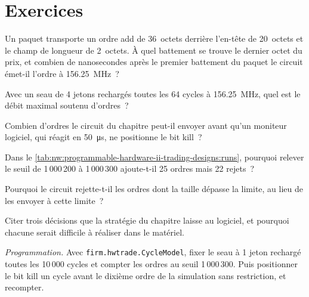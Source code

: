 \section{Exercices}

\begin{exercise}[$\star$]\label{exo:nw:programmable-hardware-ii-trading-designs:1}
Un paquet transporte un ordre add de 36~octets derrière l'en-tête de 20~octets et le champ de longueur de 2~octets. À quel battement se trouve le dernier octet du prix, et combien de
nanosecondes après le premier battement du paquet le circuit émet-il l'ordre à 156.25~MHz~?
\end{exercise}

\begin{exercise}[$\star$]\label{exo:nw:programmable-hardware-ii-trading-designs:2}
Avec un seau de 4 jetons rechargés toutes les 64 cycles à 156.25~MHz, quel est le débit maximal soutenu d'ordres~?
\end{exercise}

\begin{exercise}[$\star$]\label{exo:nw:programmable-hardware-ii-trading-designs:3}
Combien d'ordres le circuit du chapitre peut-il envoyer avant qu'un moniteur logiciel, qui réagit en \qty{50}{\micro\second}, ne positionne le bit kill~?
\end{exercise}

\begin{exercise}[$\star\star$]\label{exo:nw:programmable-hardware-ii-trading-designs:4}
Dans le \cref{tab:nw:programmable-hardware-ii-trading-designs:runs}, pourquoi relever le seuil de 1\,000\,200 à 1\,000\,300 ajoute-t-il 25 ordres mais
22 rejets~?
\end{exercise}

\begin{exercise}[$\star\star$]\label{exo:nw:programmable-hardware-ii-trading-designs:5}
Pourquoi le circuit rejette-t-il les ordres dont la taille dépasse la limite, au lieu de les envoyer à cette limite~?
\end{exercise}

\begin{exercise}[$\star\star$]\label{exo:nw:programmable-hardware-ii-trading-designs:6}
Citer trois décisions que la stratégie du chapitre laisse au logiciel, et pourquoi chacune serait difficile à réaliser dans le matériel.
\end{exercise}

\begin{exercise}[$\star\star\star$]\label{exo:nw:programmable-hardware-ii-trading-designs:7}
\emph{Programmation.} Avec \texttt{firm.hwtrade.CycleModel}, fixer le seau à 1 jeton rechargé toutes les 10\,000 cycles et compter les ordres au seuil
1\,000\,300. Puis positionner le bit kill un cycle avant le dixième ordre de la simulation sans restriction, et recompter.
\end{exercise}

